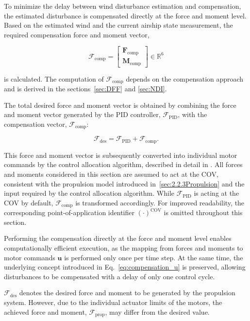 To minimize the delay between wind disturbance estimation and compensation, the estimated disturbance is compensated directly at the force and moment level.
Based on the estimated wind and the current airship state measurement, the required compensation force and moment vector,

\begin{equation}
	\bm{\mathcal{F}}_{\text{comp}} 
	= 
	\begin{bmatrix} 
		\bm{F}_{\text{comp}} \\ 
		\bm{M}_{\text{comp}} 
	\end{bmatrix} \in \mathbb{R}^6
\end{equation}

is calculated. The computation of $\bm{\mathcal{F}}_{\text{comp}}$ depends on the compensation approach and is derived in the sections~\ref{sec:DFF} and \ref{sec:NDI}.

The total desired force and moment vector is obtained by combining the force and moment vector generated by the PID controller, $\bm{\mathcal{F}}_{\text{PID}}$, with the compensation vector, $\bm{\mathcal{F}}_{\text{comp}}$:

\begin{equation}
	\bm{\mathcal{F}}_\mathrm{des} = \bm{\mathcal{F}}_{\text{PID}} + \bm{\mathcal{F}}_{\text{comp}}.
\end{equation}

This force and moment vector is subsequently converted into individual motor commands by the control allocation algorithm, described in detail in \cite{Ahmed2022Controller}. All forces and moments considered in this section are assumed to act at the COV, consistent with the propulsion model introduced in~\ref{sec:2.2.3Propulsion} and the input required by the control allocation algorithm. While $\bm{\mathcal{F}}_\mathrm{PID}$ is acting at the COV by default, $\bm{\mathcal{F}}_\mathrm{comp}$ is transformed accordingly. For improved readability, the corresponding point-of-application identifier $(\cdot)^\mathrm{COV}$ is omitted throughout this section.

Performing the compensation directly at the force and moment level enables computationally efficient execution, as the mapping from forces and moments to motor commands $\bm{u}$ is performed only once per time step. At the same time, the underlying concept introduced in Eq.~\eqref{eq:compensation_u} is preserved, allowing disturbances to be compensated with a delay of only one control cycle. 

$\bm{\mathcal{F}}_\mathrm{des}$ denotes the desired force and moment to be generated by the propulsion system. However, due to the individual actuator limits of the motors, the achieved force and moment, $\bm{\mathcal{F}}_\mathrm{prop}$, may differ from the desired value.

